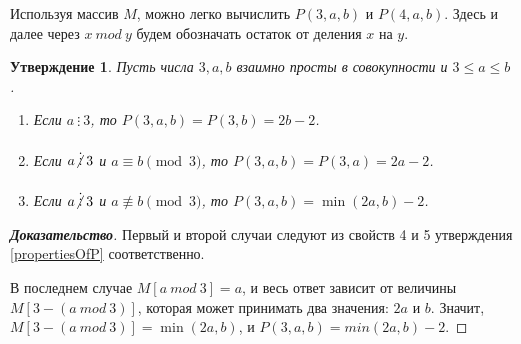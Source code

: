 \documentclass[12pt]{article}
\newtheorem{proposition}[theorem]{Утверждение}
\theoremstyle{definition}
\begin{document}
Используя массив $M$, можно легко вычислить $P(3, a, b)$ и $P(4, a, b)$. Здесь и далее через $x \ mod \ y$ будем обозначать  остаток от деления $x$ на $y$.

\begin{proposition}
Пусть числа $3, a, b$ взаимно просты в совокупности и $3 \le a \le b$.
\begin{enumerate}
\item Если $a \ \vdots \ 3$, то $P(3, a, b) = P(3, b) = 2b - 2$.
\item Если $a \centernot\vdots 3$ и $a \equiv b \pmod 3$, то $P(3, a, b) = P(3, a) = 2a - 2$.
\item Если $a \centernot\vdots 3$ и $a \not \equiv b \pmod 3$, то $P(3, a, b) = \min(2a, b) - 2$.
\end{enumerate}
\end{proposition}
\begin{proof}[\textbf{Доказательство}]
Первый и второй случаи следуют из свойств 4 и 5 утверждения \ref{propertiesOfP} соответственно.

В последнем случае $M[a \ mod \ 3] = a$, и весь ответ зависит от величины $M[3 - (a \ mod \ 3)]$, которая может принимать два значения: $2a$ и $b$. Значит, $M[3 - (a \ mod \ 3)] = \min(2a, b)$, и $P(3, a, b) = min(2a, b) - 2$.
\end{proof}
\end{document}
